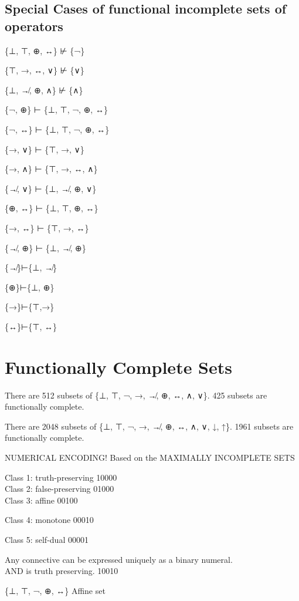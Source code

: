 \hypertarget{special-cases-of-functional-incomplete-sets-of-operators}{%
\subsection{Special Cases of functional incomplete sets of
operators}\label{special-cases-of-functional-incomplete-sets-of-operators}}

\{⊥, ⊤, ⊕, ↔\} ⊬ \{¬\}

\{⊤, →, ↔, ∨\} ⊬ \{∨\}

\{⊥, ↛, ⊕, ∧\} ⊬ \{∧\}

\{¬, ⊕\} ⊢ \{⊥, ⊤, ¬, ⊕, ↔\}

\{¬, ↔\} ⊢ \{⊥, ⊤, ¬, ⊕, ↔\}

\{→, ∨\} ⊢ \{⊤, →, ∨\}

\{→, ∧\} ⊢ \{⊤, →, ↔, ∧\}

\{↛, ∨\} ⊢ \{⊥, ↛, ⊕, ∨\}

\{⊕, ↔\} ⊢ \{⊥, ⊤, ⊕, ↔\}

\{→, ↔\} ⊢ \{⊤, →, ↔\}

\{↛, ⊕\} ⊢ \{⊥, ↛, ⊕\}

\{↛\}⊢\{⊥, ↛\}

\{⊕\}⊢\{⊥, ⊕\}

\{→\}⊢\{⊤,→\}

\{↔\}⊢\{⊤, ↔\}

\hypertarget{functionally-complete-sets}{%
\section{Functionally Complete Sets}\label{functionally-complete-sets}}

There are 512 subsets of \{⊥, ⊤, ¬, →, ↛, ⊕, ↔, ∧, ∨\}. 425 subsets are
functionally complete.

There are 2048 subsets of \{⊥, ⊤, ¬, →, ↛, ⊕, ↔, ∧, ∨, ↓, ↑\}. 1961
subsets are functionally complete.

NUMERICAL ENCODING! Based on the MAXIMALLY INCOMPLETE SETS

Class 1: truth-preserving 10000\\
Class 2: false-preserving 01000\\
Class 3: affine 00100

Class 4: monotone 00010

Class 5: self-dual 00001

Any connective can be expressed uniquely as a binary numeral.\\
AND is truth preserving. 10010

\{⊥, ⊤, ¬, ⊕, ↔\} Affine set

